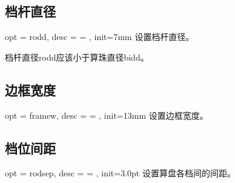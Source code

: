 \documentclass[full]{l3doc}
\begin{document}
\begin{documentation}
\subsection{档杆直径}

\begin{option}{ opt = rodd, desc = {= }, init=7mm }
  设置档杆直径。
\end{option}

\begin{noteen}
  档杆直径rodd应该小于算珠直径bidd。
\end{noteen}

\begin{SideBySideExample}[frame=single,numbers=left,%
                xrightmargin=.40\linewidth,gobble=2]
  \centering
  \begin{suanpan}
  \end{suanpan}
\end{SideBySideExample}

\subsection{边框宽度}

\begin{option}{ opt = framew, desc = {= }, init=13mm }
  设置边框宽度。
\end{option}

\begin{SideBySideExample}[frame=single,numbers=left,%
                xrightmargin=.40\linewidth,gobble=2]
  \centering
  \begin{suanpan}
    \mkframe
  \end{suanpan}
\end{SideBySideExample}

\subsection{档位间距}

\begin{option}{ opt = rodsep, desc = {= }, init=3.0pt }
  设置算盘各档间的间距。
\end{option}

\begin{SideBySideExample}[frame=single,numbers=left,%
                xrightmargin=.40\linewidth,gobble=2]
  \centering
  \begin{suanpan}
  \end{suanpan}
\end{SideBySideExample}


\end{documentation}
\end{document}
